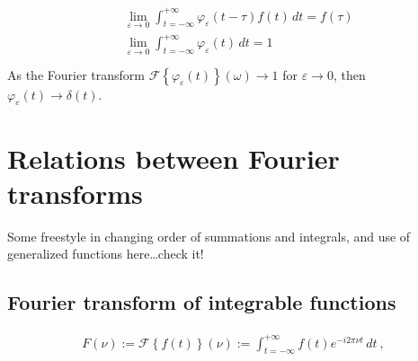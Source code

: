 \documentclass[letterpaper,10pt,english]{jupyterBook}
\begin{document}
\begin{enumerate}
\begin{equation*}
\begin{split}\begin{aligned}
      & \lim_{\varepsilon \rightarrow 0} \int_{t = -\infty}^{+\infty} \varphi_{\varepsilon}(t- \tau) f(t) \, dt = f(\tau) \\
      & \lim_{\varepsilon \rightarrow 0} \int_{t = -\infty}^{+\infty} \varphi_{\varepsilon}(t) \, dt = 1 \\
    \end{aligned}\end{split}
\end{equation*}
\sphinxAtStartPar
As the Fourier transform \(\mathscr{F}\left\{\varphi_{\varepsilon}(t)\right\}(\omega) \rightarrow 1\) for \(\varepsilon \rightarrow 0\), then \(\varphi_{\varepsilon}(t) \rightarrow \delta(t)\).

\end{enumerate}



\sphinxstepscope


\section{Relations between Fourier transforms}
\label{\detokenize{ch/complex/fourier-transforms:relations-between-fourier-transforms}}\label{\detokenize{ch/complex/fourier-transforms:complex-fourier-transforms}}\label{\detokenize{ch/complex/fourier-transforms::doc}}
\sphinxAtStartPar
Some freestyle in changing order of summations and integrals, and use of generalized functions here…check it!


\subsection{Fourier transform of integrable functions}
\label{\detokenize{ch/complex/fourier-transforms:fourier-transform-of-integrable-functions}}\label{\detokenize{ch/complex/fourier-transforms:complex-fourier-transform}}\begin{equation*}
\begin{split}F(\nu) := \mathscr{F}\left\{f(t)\right\}(\nu) := \int_{t=-\infty}^{+\infty} f(t) e^{-i 2 \pi \nu t} \, dt \ ,\end{split}
\end{equation*}
\end{document}
